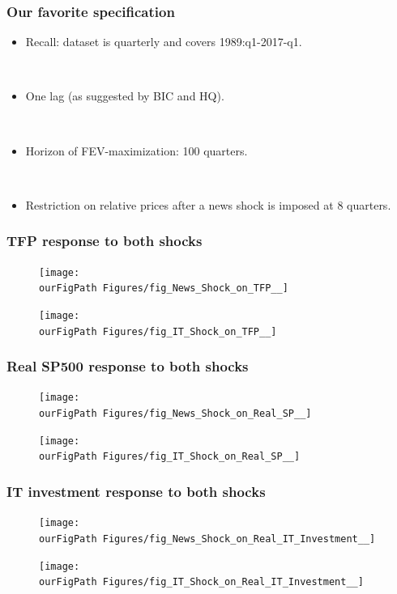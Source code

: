 \documentclass{beamer}
\def \ourFigPath {../../}
\begin{document}
\begin{frame}
	\frametitle{Our favorite specification}
	
	\begin{itemize}
	\item Recall: dataset is quarterly and covers 1989:q1-2017-q1.
	
	\
	
	\item One lag (as suggested by BIC and HQ).
	
	\
	
	\item Horizon of FEV-maximization: 100 quarters.
	
	\
	
	\item Restriction on relative prices after a news shock is imposed at 8 quarters.
	
	\end{itemize}


	
	
\end{frame}

\begin{frame}
\frametitle{TFP response to both shocks}
\begin{figure}
	\centering
	\texttt{[image: \\ourFigPath Figures/fig\_News\_Shock\_on\_TFP\_\_]}
\end{figure}
\begin{figure}
	\centering
	\texttt{[image: \\ourFigPath Figures/fig\_IT\_Shock\_on\_TFP\_\_]}
\end{figure}
\end{frame}

\begin{frame}
\frametitle{Real SP500 response to both shocks}
\begin{figure}
	\centering
	\texttt{[image: \\ourFigPath Figures/fig\_News\_Shock\_on\_Real\_SP\_\_]}
\end{figure}
\begin{figure}
	\centering
	\texttt{[image: \\ourFigPath Figures/fig\_IT\_Shock\_on\_Real\_SP\_\_]}
\end{figure}
\end{frame}

\begin{frame}
\frametitle{IT investment response to both shocks}
\begin{figure}
	\centering
	\texttt{[image: \\ourFigPath Figures/fig\_News\_Shock\_on\_Real\_IT\_Investment\_\_]}
\end{figure}
\begin{figure}
	\centering
	\texttt{[image: \\ourFigPath Figures/fig\_IT\_Shock\_on\_Real\_IT\_Investment\_\_]}
\end{figure}
\end{frame}
\end{document}

